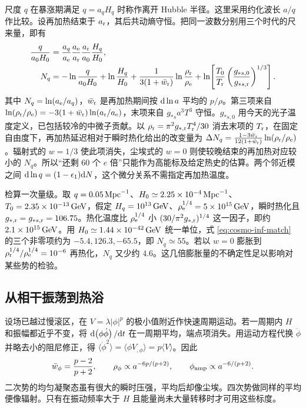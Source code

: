 尺度 $q$ 在暴涨期满足 $q=a_qH_q$ 时称作离开 Hubble 半径。这里采用约化波长 $a/q$ 作比较。设再加热结束于 $a_{\rm r}$，其后共动熵守恒。把同一波数分别用三个时代的尺来量，即有
\begin{align}
 \frac{q}{a_0H_0}
 &=\frac{a_q}{a_{\rm e}}\frac{a_{\rm e}}{a_{\rm r}}
   \frac{a_{\rm r}}{a_0}\frac{H_q}{H_0},\nonumber\\
 N_q
 &= -\ln\frac{q}{a_0H_0}+\ln\frac{H_q}{H_0}
 +\frac1{3(1+\bar w_{\rm r})}\ln\frac{\rho_{\rm r}}{\rho_{\rm e}}
 +\ln\!\left[\frac{T_0}{T_{\rm r}}
       \left(\frac{g_{*s,0}}{g_{*s,{\rm r}}}\right)^{1/3}\right] .
 \label{eq:cosmo-inf-match}
\end{align}
其中 $N_q=\ln(a_{\rm e}/a_q)$，$\bar w_{\rm r}$ 是再加热期间按 $\dd\ln a$ 平均的 $p/\rho$。第三项来自 $\ln(\rho_{\rm r}/\rho_{\rm e})=-3(1+\bar w_{\rm r})\ln(a_{\rm r}/a_{\rm e})$，末项来自 $g_{*s}a^3T^3$ 守恒。$g_{*s,0}$ 用今天的光子温度定义，已包括较冷的中微子贡献。以 $\rho_{\rm r}=\pi^2g_{*,{\rm r}}T_{\rm r}^4/30$ 消去末项的 $T_{\rm r}$，在固定自由度下，再加热延迟相对于瞬时热化给出的改变量为 $\Delta N_q=\frac{1-3\bar w_{\rm r}}{12(1+\bar w_{\rm r})} \ln(\rho_{\rm r}/\rho_{\rm e})$。辐射式的 $w=1/3$ 使此项消失，尘埃式的 $w=0$ 则使较晚结束的再加热对应较小的 $N_q$。所以“还剩 60 个 $e$ 倍”只能作为高能标及给定热史的估算。两个邻近模之间 $\dd\ln q=(1-\epsilon_1)\dd N$，这个微分关系不需指定再加热温度。

检算一次量级。取 $q=0.05\,{\rm Mpc}^{-1}$、$H_0\simeq2.25\times10^{-4}\,{\rm Mpc}^{-1}$、$T_0=2.35\times10^{-13}\,{\rm GeV}$，假定 $H_q=10^{13}\,{\rm GeV}$、$\rho_{\rm e}^{1/4}=5\times10^{15}\,{\rm GeV}$，瞬时热化且 $g_{*,{\rm r}}=g_{*s,{\rm r}}=106.75$。热化温度比 $\rho_{\rm e}^{1/4}$ 小 $(30/\pi^2g_{*,{\rm r}})^{1/4}$ 这一因子，即约 $2.1\times10^{15}\,{\rm GeV}$。用 $H_0\simeq1.44\times10^{-42}\,{\rm GeV}$ 统一单位，式 \eqref{eq:cosmo-inf-match} 的三个非零项约为 $-5.4,126.3,-65.5$，即 $N_q\simeq55$。若以 $w=0$ 膨胀到 $\rho_{\rm r}^{1/4}/\rho_{\rm e}^{1/4}=10^{-6}$ 再热化，$N_q$ 又少约 $4.6$。这几倍膨胀量的不确定性足以影响对某些势的检验。

\subsection{从相干振荡到热浴}\label{sec:cosmo-inf-reheat}

设场已越过慢滚区，在 $V=\lambda|\phi|^p$ 的极小值附近作快速周期运动。若一周期内 $H$ 和振幅都近乎不变，将 $\dd(\phi\dot\phi)/\dd t$ 在一周期平均，端点项消失。用运动方程代换 $\ddot\phi$ 并略去小的阻尼修正，得 $\langle\dot\phi^2\rangle=\langle\phi V_{,\phi}\rangle=p\langle V\rangle$。因此
\begin{equation}\label{eq:cosmo-inf-virial}
 \bar w_\phi=\frac{p-2}{p+2},\qquad
 \rho_\phi\propto a^{-6p/(p+2)},\qquad
 \phi_{\rm amp}\propto a^{-6/(p+2)} .
\end{equation}
二次势的均匀凝聚态虽有很大的瞬时压强，平均后却像尘埃。四次势做同样的平均便像辐射。只有在振动频率大于 $H$ 且能量尚未大量转移时才可用这些标度。

